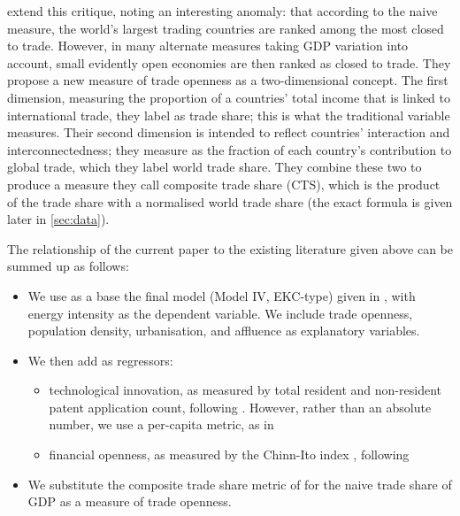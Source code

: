 \documentclass[12pt,a4paper]{article}
\begin{document}
\cite{squalliNewMeasureTrade2011} extend this critique, noting an interesting anomaly: that according to the naive measure, the world’s largest trading countries are ranked among the most closed to trade.
However, in many alternate measures taking GDP variation into account, small evidently open economies are then ranked as closed to trade.
They propose a new measure of trade openness as a two-dimensional concept.
The first dimension, measuring the proportion of a countries' total income that is linked to international trade, they label as trade share; this is what the traditional variable measures.
Their second dimension is intended to reflect countries' interaction and interconnectedness; they measure as the fraction of each country's contribution to global trade, which they label world trade share.
They combine these two to produce a measure they call composite trade share (CTS), which is the product of the trade share with a normalised world trade share (the exact formula is given later in \cref{sec:data}).

The relationship of the current paper to the existing literature given above can be summed up as follows: 
\begin{itemize}
\item We use as a base the final model (Model IV, EKC-type) given in \cite{rafiqUrbanizationOpennessEmissions2016}, with energy intensity as the dependent variable. We include trade openness, population density, urbanisation, and affluence as explanatory variables.
\item We then add as regressors:
\begin{itemize}
\item technological innovation, as measured by total resident and non-resident patent application count, following \cite{panHowIndustrializationTrade2019}. 
However, rather than an absolute number, we use a per-capita metric, as in \cite{maradanaDoesInnovationPromote2017}
\item financial openness, as measured by the Chinn-Ito index \citep{chinnWhatMattersFinancial2006}, following \cite{koengkanPositiveImpactTrade2018}
\end{itemize}
\item We substitute the composite trade share metric of \cite{squalliNewMeasureTrade2011} for the naive trade share of GDP as a measure of trade openness.
\end{itemize}
\end{document}
